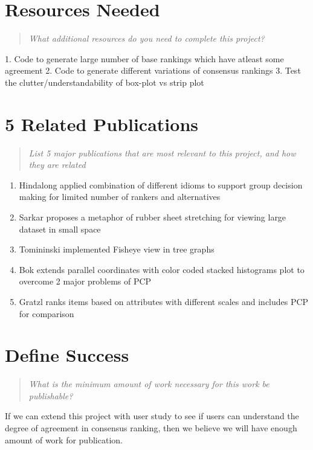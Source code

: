 \documentclass{proc}
\begin{document}
\section{Resources Needed}
\begin{quote}
\textit{What additional resources do you need to complete this project?}
\end{quote}

1. Code to generate large number of base rankings which have atleast some agreement 
2. Code to generate different variations of consensus rankings
3. Test the clutter/understandability of box-plot vs strip plot

\section{5 Related Publications}
\begin{quote}
\textit{List 5 major publications that are most relevant to this project, and how they are related}
\end{quote}

\begin{enumerate}
  \item Hindalong applied combination of different idioms to support group decision making for limited number of rankers and alternatives \cite{hindalong2020towards}
  \item Sarkar proposes a metaphor of rubber sheet stretching for viewing large dataset in small space \cite{sarkar1993stretching}
  \item Tomininski implemented Fisheye view in tree graphs \cite{tominski2006fisheye}
  \item Bok extends parallel coordinates with color coded stacked histograms plot to overcome 2 major problems of PCP \cite{bok2020augmenting}
  \item Gratzl ranks items based on attributes with different scales and includes PCP for comparison \cite{gratzl2013lineup}
\end{enumerate}

\section{Define Success}
\begin{quote}
\textit{What is the minimum amount of work necessary for this work be publishable?}
\end{quote}
If we can extend this project with user study to see if users can understand the degree of agreement in consensus ranking, then we believe we will have enough amount of work for publication.


\end{document}
